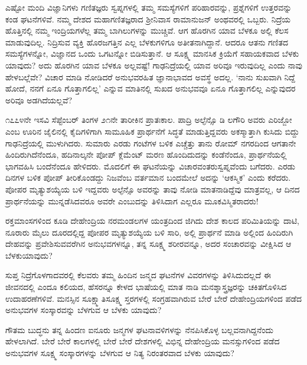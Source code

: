 \vskip 2pt

ಎಷ್ಟೋ ಮಂದಿ ವಿಜ್ಞಾನಿಗಳು ಗಣಿತಜ್ಞರು ಸ್ವಪ್ನಗಳಲ್ಲಿ ತಮ್ಮ ಸಮಸ್ಯೆಗಳಿಗೆ ಪರಿಹಾರವನ್ನು, ಪ್ರಶ್ನೆಗಳಿಗೆ ಉತ್ತರವನ್ನು ಕಂಡ ಘಟನೆಗಳಿವೆ. ನಮ್ಮ ದೇಶದ ಮಹಾಗಣಿತಜ್ಞರಾದ ಶ‍್ರೀನಿವಾಸ ರಾಮಾನುಜನ್ ಅಂಥವರಲ್ಲಿ ಒಬ್ಬರು. ನಿದ್ರೆಯ ಹೊತ್ತಿನಲ್ಲಿ ನಮ್ಮ ಇಂದ್ರಿಯಗಳೆಲ್ಲ ತಮ್ಮ ಬಾಗಿಲುಗಳನ್ನು ಮುಚ್ಚಿವೆ. ಆಗ ಹೊರಗಿನ ಯಾವ ಬೆಳಕೂ ಅಲ್ಲಿ ಕೆಲಸ ಮಾಡುವುದಿಲ್ಲ. ನಿದ್ರಿಸುವ ವ್ಯಕ್ತಿ ಹೊರಜಗತ್ತಿನ ಎಲ್ಲ ಬೆಳಕುಗಳಿಗೂ ಅತೀತನಾಗಿದ್ದಾನೆ. ಆದರೂ ಆತನು ಗಣಿತದ ಸಮಸ್ಯೆಗಳನ್ನೋ, ವಿಜ್ಞಾನದ ಒಂದು ಒಗಟನ್ನೋ ಬಿಡಿಸುತ್ತಾನೆ. ಆ ಸೂಕ್ಷ್ಮ ಮಾನಸಿಕ ಕ್ರಿಯೆಗೆ ಸಹಾಯಕವಾದ ಬೆಳಕು ಯಾವುದು? ಅದು ಹೊರಗಿನ ಯಾವ ಬೆಳಕೂ ಅಲ್ಲವಷ್ಟೆ! ಗಾಢನಿದ್ರೆಯಲ್ಲಿ ಯಾವ ಅರಿವೂ ಇರುವುದಿಲ್ಲ ಎಂದು ನಾವು ಹೇಳಬಲ್ಲೆವೇ? ವಿಚಾರ ಮಾಡಿ ನೋಡಿದರೆ ಅನುಭವರಹಿತ ಜ್ಞಾನಾಭಾವದ ಅವಸ್ಥೆ ಅದಲ್ಲ. ‘ನಾನು ಸುಖವಾಗಿ ನಿದ್ದೆ ಹೋದೆ, ನನಗೆ ಏನೂ ಗೊತ್ತಾಗಲಿಲ್ಲ’ ಎನ್ನುವ ಮಾತಿನಲ್ಲಿ ಸುಖದ ಅನುಭವವೂ ಏನೂ ಗೊತ್ತಾಗಲಿಲ್ಲ ಎನ್ನುವುದರ ಅರಿವೂ ಅಡಗಿದೆಯಲ್ಲವೆ?

\vskip 2pt

೧೭೭೪ನೇ ಇಸವಿ ಸೆಪ್ಟೆಂಬರ್ ತಿಂಗಳ ೨೧ನೇ ತಾರೀಕಿನ ಪ್ರಾತಃಕಾಲ. ಪಾದ್ರಿ ಅಲ್ಫೆನ್ಸೊ ಡಿ ಲಗೌರಿ ಅವರು ಎರಿಜ್ಜೋ ಎಂಬ ಊರಿನ ಜೈಲಿನಲ್ಲಿ ಕೈದಿಗಳಿಗಾಗಿ ಸಾಮೂಹಿಕ ಪ್ರಾರ್ಥನೆಗೆ ಸಿದ್ಧತೆ ಮಾಡುತ್ತಿದ್ದವರು ಅಕಸ್ಮಾತ್ತಾಗಿ ಕುಸಿದು ಬಿದ್ದು ಗಾಢನಿದ್ರೆಯಲ್ಲಿ ಮುಳುಗಿದರು. ಸುಮಾರು ಎರಡು ಗಂಟೆಗಳ ಬಳಿಕ ಎಚ್ಚೆತ್ತು ತಾನು ರೋಮ್ ನಗರದಿಂದ ಆಗತಾನೇ ಹಿಂದಿರುಗಿದೆ\-ನೆಂದೂ, ಹದಿನಾಲ್ಕನೇ ಪೋಪ್ ಕ್ಲೆಮೆಂಟ್ ಮರಣ ಹೊಂದಿದುದನ್ನು ಕಂಡೆನೆಂದೂ, ಪ್ರಾರ್ಥನೆಯಲ್ಲಿ ಭಾಗವಹಿಸಿ ಬಂದೆನೆಂದೂ ಹೇಳಿದರು. ಮೊದಲಿಗೆ ಈ ಘಟನೆಯನ್ನು ವಿಚಾರವಂತರು\break ಸ್ವಪ್ನವೆಂದು ಬಗೆದರು. ಎರಡು ದಿನಗಳ ಬಳಿಕ ಪೋಪ್ ತೀರಿಕೊಂಡದ್ದು ನಿಜವೆಂಬ ವರ್ತಮಾನ ಬಂದಮೇಲೆ ಅದನ್ನು ‘ಆಕಸ್ಮಿಕ’ ಎಂದು ಕರೆದರು. ಪೋಪರ ಮೃತ್ಯುಶಯ್ಯೆಯ ಬಳಿ ಇದ್ದವರು ಅಲ್ಫೆನ್ಸೊ ಅವರನ್ನು ತಾವು ನೋಡಿ ಮಾತನಾಡಿದ್ದೆವು ಮಾತ್ರವಲ್ಲ, ಆ ದಿನದ ಪ್ರಾರ್ಥನೆಯನ್ನು ಮುನ್ನಡೆಸಿದವರೂ ಅವರೇ ಎಂಬುದನ್ನು ತಿಳಿಸಿದಾಗ ಎಲ್ಲರೂ ಮೂಕವಿಸ್ಮಿತರಾದರು!

\vskip 2pt

ರಕ್ತಮಾಂಸಗಳಿಂದ ಕೂಡಿ ದೇಹೇಂದ್ರಿಯ ನರಮಂಡಲಗಳ ಯಂತ್ರದಿಂದ ಜಿಗಿದು ದೇಶ ಕಾಲದ ಪರಿಮಿತಿಯನ್ನು ದಾಟಿ, ನೂರಾರು ಮೈಲು ದೂರದಲ್ಲಿದ್ದ ಪೋಪರ ಮೃತ್ಯುಶಯ್ಯೆಯ ಬಳಿ ಸಾರಿ, ಅಲ್ಲಿ ಪ್ರಾರ್ಥನೆ ಮಾಡಿ ಅಲ್ಲಿಂದ ಹಿಂದಿರುಗಿ ದೇಹವನ್ನು ಪ್ರವೇಶಿಸುವವರೆಗಿನ ಅನುಭವಗಳನ್ನೂ, ತನ್ನ ಸೂಕ್ಷ್ಮ ಶರೀರವನ್ನೂ, ಅದರ ಸಂಚಾರವನ್ನು ವೀಕ್ಷಿಸಿದ ಆ ಬೆಳಕು\break ಯಾವುದು?

ಸುಪ್ತ ನಿದ್ರೆಗೊಳಗಾದವರಲ್ಲಿ ಕೆಲವರು ತಮ್ಮ ಹಿಂದಿನ ಜನ್ಮದ ಘಟನೆಗಳ ವಿವರಗಳನ್ನು ತಿಳಿಸಿದುದಲ್ಲದೆ ಈ ಜೀವನದಲ್ಲಿ ಎಂದೂ ಕಲಿಯದ, ಹೆಸರನ್ನೂ ಕೇಳದ ಭಾಷೆಯಲ್ಲಿ ಮಾತ ನಾಡಿ ಮನಶ್ಶಾಸ್ತ್ರಜ್ಞರನ್ನು ಚಕಿತಗೊಳಿಸಿದ ಉದಾಹರಣೆಗಳಿವೆ. ಮನಸ್ಸಿನ ಸೂಕ್ಷ್ಮಾತಿಸೂಕ್ಷ್ಮ ಸ್ತರಗಳಲ್ಲಿ ಸಂಗ್ರಹವಾಗಿರುವ ಬೇರೆ ಬೇರೆ ದೇಹೇಂದ್ರಿಯಗಳಿಂದ ಪಡೆದ ಅನುಭವಗಳ ಸಂಸ್ಕಾರವನ್ನು ಬೆಳಗುವ ಆ ಬೆಳಕು ಯಾವುದು?

ಗೌತಮ ಬುದ್ಧನು ತನ್ನ ಹಿಂದಣ ಐನೂರು ಜನ್ಮಗಳ ಘಟನಾವಳಿಗಳನ್ನು ನೆನಪಿಸಿಕೊಳ್ಳ ಬಲ್ಲವನಾಗಿದ್ದನೆಂದು ಹೇಳಲಾಗಿದೆ. ಬೇರೆ ಬೇರೆ ಕಾಲಗಳಲ್ಲಿ ಬೇರೆ ಬೇರೆ ದೇಶಗಳಲ್ಲಿ ವಿಭಿನ್ನ ದೇಹೇಂದ್ರಿಯ ಮನಸ್ಸುಗಳಿಂದ ಪಡೆದ ಅನುಭವಗಳ ಸೂಕ್ಷ್ಮ ಸಂಸ್ಕಾರಗಳನ್ನು ಬೆಳಗುವ ಆ ನಿತ್ಯ ನಿರಂತರವಾದ ಬೆಳಕು ಯಾವುದು?

